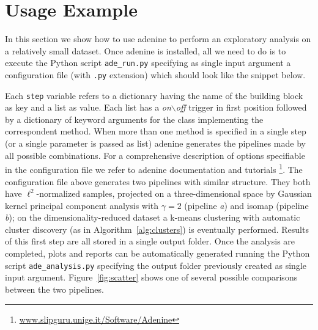 \documentclass[twoside,11pt]{article}
\makeatletter
\newcommand{\ade}{{\sc adenine}\@\xspace}
\newcommand{\py}{{Python}\@\xspace}
\makeatother
\begin{document}
\section{Usage Example}
In this section we show how to use \ade to perform an exploratory analysis on a relatively small dataset. Once \ade is installed, all we need to do is to execute the \py script \texttt{ade\_run.py} specifying as single input argument a configuration file (with \texttt{.py} extension) which should look like the snippet below.
 


\noindent Each \texttt{step} variable refers to a dictionary having the name of the building block as key and a {list} as value. Each list has a \emph{on$\backslash$off} trigger in first position followed by a dictionary of keyword arguments for the class implementing the correspondent method. When more than one method is specified in a single step (or a single parameter is passed as {list}) \ade generates the pipelines made by all possible combinations. 
For a comprehensive description of options specifiable in the configuration file we refer to \ade documentation and tutorials \footnote{\url{www.slipguru.unige.it/Software/Adenine}}.
The configuration file above generates two pipelines with similar structure. They both have $\ell^2$-normalized samples, projected on a three-dimensional space by Gaussian kernel principal component analysis with $\gamma=2$ (pipeline \textit{a}) and isomap (pipeline \textit{b}); on the dimensionality-reduced dataset a k-means clustering with automatic cluster discovery (as in Algorithm~\ref{alg:clusters}) is eventually performed.
Results of this first step are all stored in a single output folder. Once the analysis are completed, plots and reports can be automatically generated running the \py script \texttt{ade\_analysis.py} specifying the output folder previously created as single input argument. Figure~\ref{fig:scatter} shows one of several possible comparisons between the two pipelines.
\end{document}
